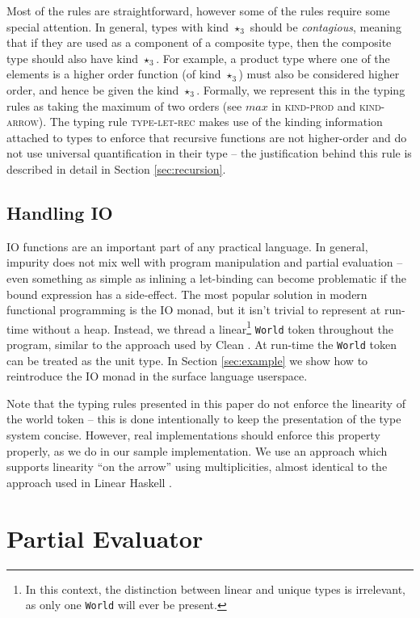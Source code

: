 \documentclass[runningheads]{llncs}
\begin{document}
Most of the rules are straightforward, however some of the rules require some special attention. In general, types with kind $\star_3$ should be \emph{contagious}, meaning that if they are used as a component of a composite type, then the composite type should also have kind $\star_3$. For example, a product type where one of the elements is a higher order function (of kind $\star_3$) must also be considered higher order, and hence be given the kind $\star_3$. Formally, we represent this in the typing rules as taking the maximum of two orders (see $max$ in \textsc{kind-prod} and \textsc{kind-arrow}). The typing rule \textsc{type-let-rec} makes use of the kinding information attached to types to enforce that recursive functions are not higher-order and do not use universal quantification in their type -- the justification behind this rule is described in detail in Section \ref{sec:recursion}.


\subsection{Handling IO}

IO functions are an important part of any practical language. In general, impurity does not mix well with program manipulation and partial evaluation -- even something as simple as inlining a let-binding can become problematic if the bound expression has a side-effect. The most popular solution in modern functional programming is the IO monad, but it isn't trivial to represent at run-time without a heap. Instead, we thread a linear\footnote{In this context, the distinction between linear and unique types is irrelevant, as only one \texttt{World} will ever be present.} \texttt{World} token throughout the program, similar to the approach used by Clean \cite{koopman2002functional}. At run-time the \texttt{World} token can be treated as the unit type. In Section \ref{sec:example} we show how to reintroduce the IO monad in the surface language userspace.

Note that the typing rules presented in this paper do not enforce the linearity of the world token -- this is done intentionally to keep the presentation of the type system concise. However, real implementations should enforce this property properly, as we do in our sample implementation. We use an approach which supports linearity ``on the arrow'' using multiplicities, almost identical to the approach used in Linear Haskell \cite{bernardy2017linear}.


\section{Partial Evaluator}
\end{document}
